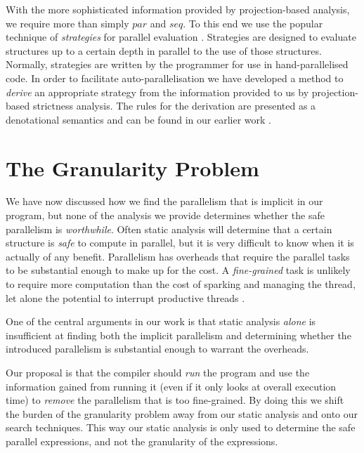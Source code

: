 With the more sophisticated information provided by projection-based analysis,
we require more than simply $par$ and $seq$. To this end we use the popular
technique of \emph{strategies} for parallel evaluation \citep{strategies,
marlow2010seq}. Strategies are designed to evaluate structures up to a certain
depth in parallel to the use of those structures. Normally, strategies are
written by the programmer for use in hand-parallelised code. In order to
facilitate auto-parallelisation we have developed a method to \emph{derive} an
appropriate strategy from the information provided to us by projection-based
strictness analysis. The rules for the derivation are presented as a
denotational semantics and can be found in our earlier work \citep{calderon}.

\section{The Granularity Problem}

We have now discussed how we find the parallelism that is implicit in our
program, but none of the analysis we provide determines whether the safe
parallelism is \emph{worthwhile}. Often static analysis will determine that a
certain structure is \emph{safe} to compute in parallel, but it is very
difficult to know when it is actually of any benefit. Parallelism has overheads
that require the parallel tasks to be substantial enough to make up for the
cost. A \emph{fine-grained} task is unlikely to require more computation than
the cost of sparking and managing the thread, let alone the potential to
interrupt productive threads \citep{hammond2000research, hogen1992automatic}.

One of the central arguments in our work is that static analysis \emph{alone}
is insufficient at finding both the implicit parallelism and determining whether
the introduced parallelism is substantial enough to warrant the overheads.

Our proposal is that the compiler should \emph{run} the program and use the
information gained from running it (even if it only looks at overall execution
time) to \emph{remove} the parallelism that is too fine-grained. By doing this
we shift the burden of the granularity problem away from our static analysis
and onto our search techniques. This way our static analysis is only used to
determine the safe parallel expressions, and not the granularity of the
expressions.
